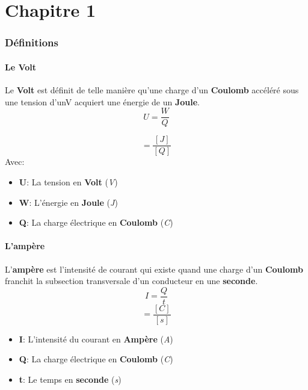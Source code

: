 \part{Chapitre 1}
 \section{Définitions}
 \subsection{Le Volt}
 Le \textbf{Volt} est définit de telle manière qu'une charge d'un \textbf{Coulomb} accéléré sous une tension d'unV acquiert une énergie de un \textbf{Joule}.\\
 \begin{equation}
	 U = \frac{W}{Q}
 \end{equation}

 \begin{equation}
	 [V] = \frac{[J]}{[Q]}
 \end{equation}
 Avec:
 \begin{itemize}
	 \item \textbf{U}: La tension en \textbf{Volt} (\textit{V})
	 \item \textbf{W}: L'énergie en \textbf{Joule} (\textit{J})
	 \item \textbf{Q}: La charge électrique en \textbf{Coulomb} (\textit{C})
 \end{itemize}

 \subsection{L'ampère}
 L'\textbf{ampère} est l'intensité de courant qui existe quand une charge d'un \textbf{Coulomb} franchit la subsection transversale d'un conducteur en une \textbf{seconde}.\\
 \begin{equation}
	 I = \frac{Q}{t}
 \end{equation}
 \begin{equation}
	 [A] = \frac{[C]}{[s]}
 \end{equation}

 \begin{itemize}
	 \item \textbf{I}: L'intensité du courant en \textbf{Ampère} (\textit{A})
	 \item \textbf{Q}: La charge électrique en \textbf{Coulomb} (\textit{C})
	 \item \textbf{t}: Le temps en \textbf{seconde} (\textit{s})
 \end{itemize}

